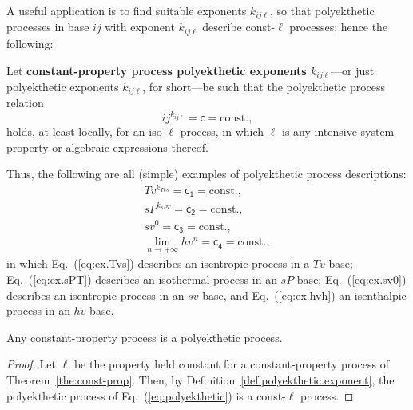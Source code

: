     A useful application is to  find  suitable  exponents  $k_{ij\ell}$,  so  that  polyekthetic
    processes in base $ij$ with exponent $k_{ij\ell}$ describe const-$\ell$ processes; hence the
    following:

    \begin{definition}\label{def:polyekthetic.exponent}
        Let \textbf{constant-property process  polyekthetic  exponents  $k_{ij\ell}$}---or  just
        polyekthetic exponents $k_{ij\ell}$, for short---be such that the  polyekthetic  process
        relation
        \begin{equation}
            ij^{k_{ij\ell}} = \mathsf{c} = \mbox{const.},
            \label{eq:polyekthetic}
        \end{equation}
        \noindent holds, at least locally, for an iso-$\ell$ process, in  which  $\ell$  is  any
        intensive system property or algebraic expressions thereof.
    \end{definition}

    Thus, the following are all (simple) examples of polyekthetic process descriptions:
    \begin{align}
        Tv^{k_{Tvs}} = \mathsf{c_1} = \mbox{const.}, \label{eq:ex.Tvs} \\
        sP^{k_{sPT}} = \mathsf{c_2} = \mbox{const.}, \label{eq:ex.sPT} \\
        sv^0 = \mathsf{c_3} = \mbox{const.}, \label{eq:ex.sv0} \\
        \lim_{n \to +\infty}hv^n = \mathsf{c_4} = \mbox{const.}, \label{eq:ex.hvh}
    \end{align}
    \noindent in which Eq.~(\ref{eq:ex.Tvs}) describes an isentropic process  in  a  $Tv$  base;
    Eq.~(\ref{eq:ex.sPT}) describes an isothermal process in an $sP$ base; Eq.~(\ref{eq:ex.sv0})
    describes an isentropic process in an $sv$ base, and  Eq.~(\ref{eq:ex.hvh})  an  isenthalpic
    process in an $hv$ base.

    \begin{theorem}\label{the:const-prop}
        Any constant-property process is a polyekthetic process.
    \end{theorem}

    \begin{proof}
        Let  $\ell$  be  the  property  held  constant  for  a  constant-property   process   of
        Theorem~\ref{the:const-prop}. Then, by  Definition~\ref{def:polyekthetic.exponent},  the
        polyekthetic process of Eq.~(\ref{eq:polyekthetic}) is a const-$\ell$ process.
    \end{proof}

